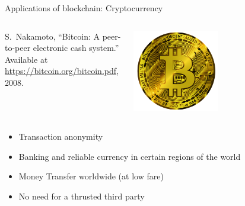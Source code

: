 \documentclass{beamer}
\begin{document}
\begin{frame}{Applications of blockchain: Cryptocurrency}
\begin{columns}
\begin{column}{0.5\textwidth}
   
{\footnotesize
\begin{thebibliography}{1}
S.~Nakamoto, ``Bitcoin: A peer-to-peer electronic cash system.'' Available at
  \href{https://bitcoin.org/bitcoin.pdf}{https://bitcoin.org/bitcoin.pdf},
  2008.
\end{thebibliography}  
}
\end{column}
\begin{column}{0.5\textwidth}  %
    \begin{center}
     \includegraphics[width=0.5\textwidth]{../../../Figures/bitcoin-6284869_1920.png}
     \end{center}
\end{column}
\end{columns}

\begin{itemize}
  \item Transaction anonymity
  \item Banking and reliable currency in certain regions of the world
  \item Money Transfer worldwide (at low fare)
  \item No need for a thrusted third party
\end{itemize}
\end{frame}
\end{document}
